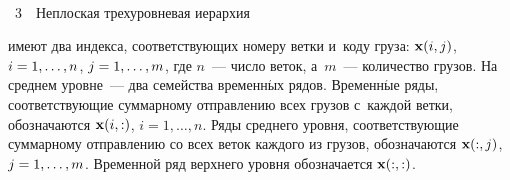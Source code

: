 \begin{multicols}{2}
\begin{center}  %
\vspace*{2pt}
\mbox{%
 \epsfxsize=80mm
 }


\vspace*{6pt}

{{\figurename~3}\ \ \small{Неплоская трехуровневая иерархия}}

\end{center}




\addtocounter{figure}{1}





 \noindent
 имеют два индекса, соответствующих
  номеру  ветки и~коду груза: $\mathbf{x}(i, j)$, $i \hm= 1,
\ldots, n$, $j \hm= 1, \ldots, m$,
 где $n$~--- число веток,
а~$m$~--- количество грузов.
 На среднем уровне~--- два семейства
временн$\acute{\mbox{ы}}$х
 рядов. Временн$\acute{\mbox{ы}}$е ряды, соответствующие
суммарному отправлению всех грузов с~каждой ветки,
 обозначаются $\mathbf{x}(i, :)$,
$i = 1, \ldots, n$. Ряды среднего уровня, соответствующие
суммарному отправлению со всех веток каждого из грузов,
обозначаются $\mathbf{x}(:, j)$, $j\hm = 1, \ldots, m$. Временной ряд
верхнего уровня обозначается $\mathbf{x}(:, :)$.


\end{multicols}
